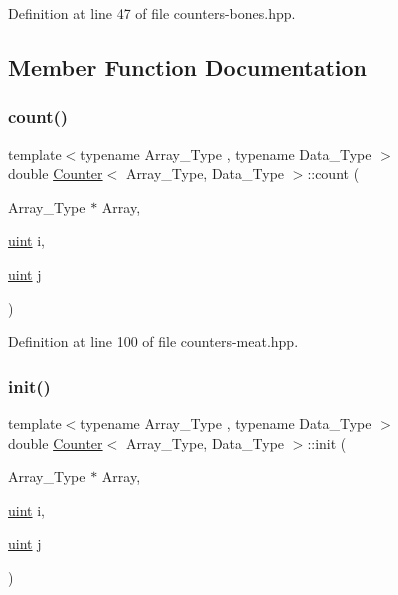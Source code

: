 Definition at line 47 of file counters-\/bones.\+hpp.



\subsection{Member Function Documentation}
\mbox{\label{class_counter_afe1d23e72c3bdca9b2481f36ebde1d95}} 
\subsubsection{\texorpdfstring{count()}{count()}}
{\footnotesize\ttfamily template$<$typename Array\+\_\+\+Type , typename Data\+\_\+\+Type $>$ \\
double \hyperlink{class_counter}{Counter}$<$ Array\+\_\+\+Type, Data\+\_\+\+Type $>$\+::count (\begin{DoxyParamCaption}\item[{Array\+\_\+\+Type $\ast$}]{Array,  }\item[{\hyperlink{typedefs_8hpp_a91ad9478d81a7aaf2593e8d9c3d06a14}{uint}}]{i,  }\item[{\hyperlink{typedefs_8hpp_a91ad9478d81a7aaf2593e8d9c3d06a14}{uint}}]{j }\end{DoxyParamCaption})\hspace{0.3cm}{\ttfamily [inline]}}



Definition at line 100 of file counters-\/meat.\+hpp.

\mbox{\label{class_counter_ae0451979ddc51a5fbf00de78c37d3216}} 
\subsubsection{\texorpdfstring{init()}{init()}}
{\footnotesize\ttfamily template$<$typename Array\+\_\+\+Type , typename Data\+\_\+\+Type $>$ \\
double \hyperlink{class_counter}{Counter}$<$ Array\+\_\+\+Type, Data\+\_\+\+Type $>$\+::init (\begin{DoxyParamCaption}\item[{Array\+\_\+\+Type $\ast$}]{Array,  }\item[{\hyperlink{typedefs_8hpp_a91ad9478d81a7aaf2593e8d9c3d06a14}{uint}}]{i,  }\item[{\hyperlink{typedefs_8hpp_a91ad9478d81a7aaf2593e8d9c3d06a14}{uint}}]{j }\end{DoxyParamCaption})\hspace{0.3cm}{\ttfamily [inline]}}



